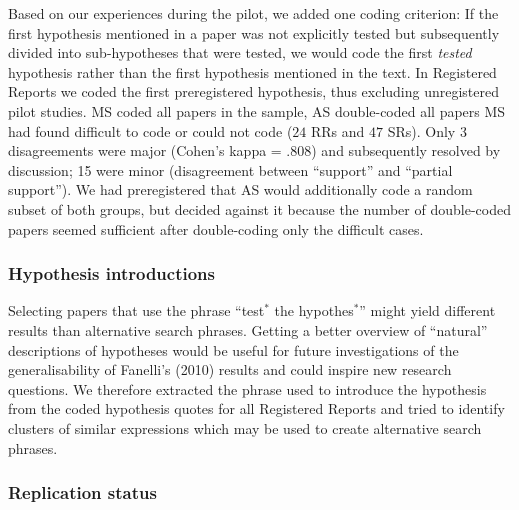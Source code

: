 \documentclass[british,,jou,floatsintext]{apa6}
\begin{document}
Based on our experiences during the pilot, we added one coding criterion:
If the first hypothesis mentioned in a paper was not explicitly tested but subsequently divided into sub-hypotheses that were tested, we would code the first \emph{tested} hypothesis rather than the first hypothesis mentioned in the text.
In Registered Reports we coded the first preregistered hypothesis, thus excluding unregistered pilot studies.
MS coded all papers in the sample, AS double-coded all papers MS had found difficult to code or could not code (\(24\) RRs and \(47\) SRs).
Only 3 disagreements were major (Cohen's kappa = .808) and subsequently resolved by discussion; 15 were minor (disagreement between \enquote{support} and \enquote{partial support}).
We had preregistered that AS would additionally code a random subset of both groups, but decided against it because the number of double-coded papers seemed sufficient after double-coding only the difficult cases.

\hypertarget{hypothesis-introductions}{%
\subsubsection{Hypothesis introductions}\label{hypothesis-introductions}}

Selecting papers that use the phrase \enquote{test\(^\ast\) the hypothes\(^\ast\)} might yield different results than alternative search phrases.
Getting a better overview of \enquote{natural} descriptions of hypotheses would be useful for future investigations of the generalisability of Fanelli's (2010) results and could inspire new research questions.
We therefore extracted the phrase used to introduce the hypothesis from the coded hypothesis quotes for all Registered Reports and tried to identify clusters of similar expressions which may be used to create alternative search phrases.

\hypertarget{replication-status}{%
\subsubsection{Replication status}\label{replication-status}}
\end{document}
